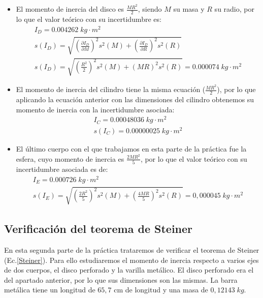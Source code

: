 \documentclass[a4paper,12pt,titlepage]{article}
\begin{document}
\begin{itemize}
    \item El momento de inercia del disco es $\frac{MR^2}{2}$, siendo $M$ su masa y $R$ su radio, por lo que el valor teórico con su incertidumbre es:
    \begin{equation}
        \begin{gathered}
            I_D = 0.004262 \; kg \cdot m^2\\
            s(I_D) = \sqrt{\left (\frac{\partial I_D}{\partial M}\right )^2s^2(M) + \left (\frac{\partial I_D}{\partial R}\right )^2s^2(R)} \\ s(I_D)= \sqrt{\left (\frac{R^2}{2}\right )^2s^2(M) + (MR)^2s^2(R)} = 0.000074 \;kg\cdot m^2
        \end{gathered}
    \end{equation}
    \item El momento de inercia del cilindro tiene la misma ecuación ($\frac{MR^2}{2}$), por lo que aplicando la ecuación anterior con las dimensiones del cilindro obtenemos su momento de inercia con la incertidumbre asociada:
    \begin{equation}
        \begin{gathered}
            I_C = 0.00048036 \; kg \cdot m^2\\
            s(I_C) = 0.00000025 \; kg \cdot m^2
        \end{gathered}
    \end{equation}
    \item El último cuerpo con el que trabajamos en esta parte de la práctica fue la esfera, cuyo momento de inercia es $\frac{2MR^2}{5}$, por lo que el valor teórico con su incertidumbre asociada es de:
    \begin{equation}
        \begin{gathered}
            I_E = 0.000726 \; kg \cdot m^2 \\
            s(I_E) = \sqrt{\left (\frac{2R^2}{5}\right )^2s^2(M) + \left (\frac{4MR}{5}\right )^2s^2(R)} = 0,000045 \; kg\cdot m^2
        \end{gathered}
    \end{equation}
\end{itemize}

\subsection{Verificación del teorema de Steiner}

En esta segunda parte de la práctica trataremos de verificar el teorema de Steiner (Ec.\ref{Steiner}). Para ello estudiaremos el momento de inercia respecto a varios ejes de dos cuerpos, el disco perforado y la varilla metálico. El disco perforado era el del apartado anterior, por lo que sus dimensiones son las mismas. La barra metálica tiene un longitud de $65,7$ cm de longitud y una masa de $0,12143 \; kg$.
\end{document}
